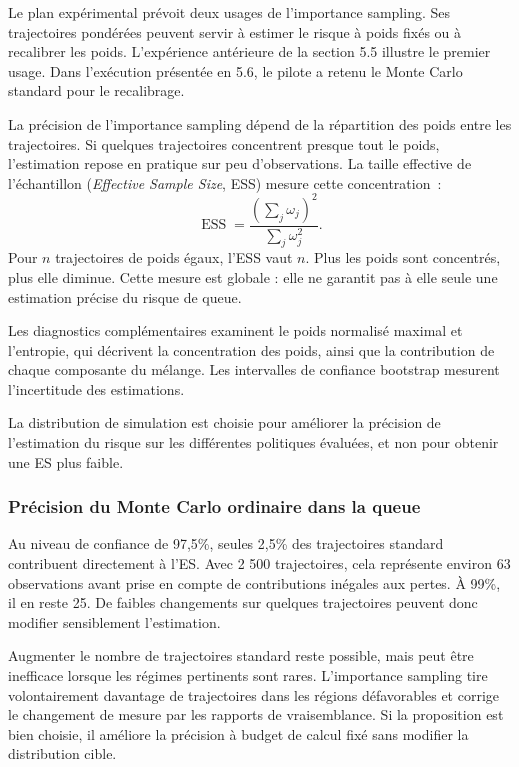 \documentclass[12pt,a4paper]{article}
\newcommand{\1}{\mathbf{1}}
\begin{document}
Le plan expérimental prévoit deux usages de l’importance sampling. Ses trajectoires pondérées peuvent servir à estimer le risque à poids fixés ou à recalibrer les poids. L’expérience antérieure de la section 5.5 illustre le premier usage. Dans l’exécution présentée en 5.6, le pilote a retenu le Monte Carlo standard pour le recalibrage.

La précision de l'importance sampling dépend de la répartition des poids entre les trajectoires. Si quelques trajectoires concentrent presque tout le poids, l'estimation repose en pratique sur peu d'observations. La taille effective de l'échantillon (\emph{Effective Sample Size}, ESS) mesure cette concentration~:
\begin{equation}
 \operatorname{ESS}=\frac{(\sum_j\omega_j)^2}{\sum_j\omega_j^2}.
\label{eq:ess}
\end{equation}
Pour $n$ trajectoires de poids égaux, l'ESS vaut $n$. Plus les poids sont concentrés, plus elle diminue. Cette mesure est globale : elle ne garantit pas à elle seule une estimation précise du risque de queue.

Les diagnostics complémentaires examinent le poids normalisé maximal et l'entropie, qui décrivent la concentration des poids, ainsi que la contribution de chaque composante du mélange. Les intervalles de confiance bootstrap mesurent l'incertitude des estimations.

La distribution de simulation est choisie pour améliorer la précision de l'estimation du risque sur les différentes politiques évaluées, et non pour obtenir une ES plus faible.

\subsubsection*{Précision du Monte Carlo ordinaire dans la queue}

Au niveau de confiance de 97,5\%, seules 2,5\% des trajectoires standard contribuent
directement à l'ES. Avec 2 500 trajectoires, cela représente environ 63 observations
avant prise en compte de contributions inégales aux pertes. À 99\%, il en reste
25. De faibles changements sur quelques trajectoires peuvent donc
modifier sensiblement l'estimation.

Augmenter le nombre de trajectoires standard reste possible, mais peut être
inefficace lorsque les régimes pertinents sont rares. L'importance sampling
tire volontairement davantage de trajectoires dans les régions défavorables et
corrige le changement de mesure par les rapports de vraisemblance. Si la proposition
est bien choisie, il améliore la précision à budget de calcul fixé sans modifier
la distribution cible.
\end{document}
